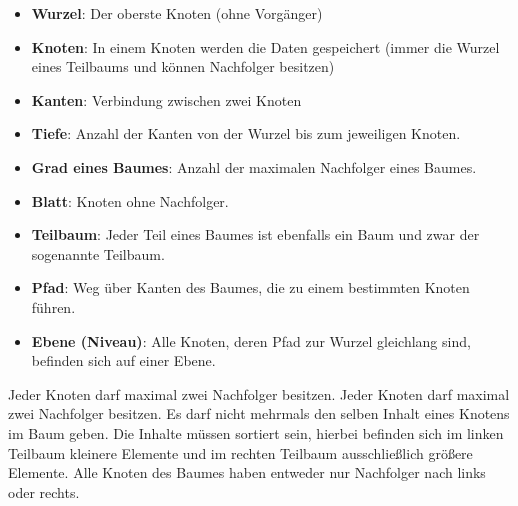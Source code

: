 \documentclass[a4paper, 12pt]{report}
\newenvironment{gblock}[1]{
    \tcolorbox[beamer,
        noparskip,
        colback=blue!25!,
        colbacklower=blue!75!blue,
        title=#1]}
{\endtcolorbox}
\begin{document}
	\begin{gblock}{Fachbegriffe Bäume}
		\begin{itemize}
			\item \textbf{Wurzel}: Der oberste Knoten (ohne Vorgänger)
			\item \textbf{Knoten}: In einem Knoten werden die Daten gespeichert (immer die Wurzel eines Teilbaums und können Nachfolger besitzen)
			\item \textbf{Kanten}: Verbindung zwischen zwei Knoten
			\item \textbf{Tiefe}: Anzahl der Kanten von der Wurzel bis zum jeweiligen Knoten.
			\item \textbf{Grad eines Baumes}: Anzahl der maximalen Nachfolger eines Baumes.
			\item \textbf{Blatt}: Knoten ohne Nachfolger.
			\item \textbf{Teilbaum}: Jeder Teil eines Baumes ist ebenfalls ein Baum und zwar der sogenannte Teilbaum.
			\item \textbf{Pfad}: Weg über Kanten des Baumes, die zu einem bestimmten Knoten führen. 
			\item \textbf{Ebene (Niveau)}: Alle Knoten, deren Pfad zur Wurzel gleichlang sind, befinden sich auf einer Ebene.
		\end{itemize}
	\end{gblock}
	\vspace{1cm}
	\begin{gblock}{Binäre Bäume (BinaryTrees)}
		Jeder Knoten darf maximal zwei Nachfolger besitzen.
	\end{gblock}
	\vspace{1cm}
	\begin{gblock}{Binäre Suchbäume (BinarySearchTrees)}
		Jeder Knoten darf maximal zwei Nachfolger besitzen.
		Es darf nicht mehrmals den selben Inhalt eines Knotens im Baum geben.
		Die Inhalte müssen sortiert sein, hierbei befinden sich im linken Teilbaum kleinere Elemente und im rechten Teilbaum ausschließlich größere Elemente.
	\end{gblock}
	\vspace{1cm}
	\begin{gblock}{Entarteter Baum}
		Alle Knoten des Baumes haben entweder nur Nachfolger nach links oder rechts.
	\end{gblock}
	\vspace{1cm}
\end{document}
